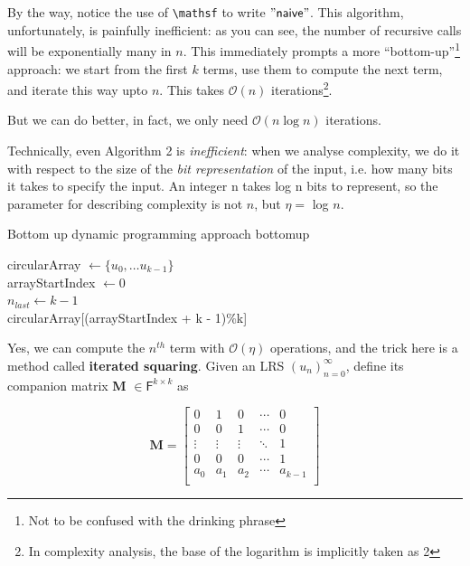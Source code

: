\documentclass{article}
\theoremstyle{definition}
\begin{document}
By the way, notice the use of \verb|\mathsf| to write $\mathsf{"naive"}$. This algorithm,
unfortunately, is painfully inefficient: as you can see, the number of recursive calls will be exponentially many in $n$. This immediately prompts a more
“bottom-up”\footnote{Not to be confused with the drinking phrase} approach: we start from
the first $k$ terms, use them to compute the next term, and iterate this way upto $n$.
This takes $\mathcal{O}(n)$ iterations\footnote{In complexity analysis, the base of the
logarithm is implicitly taken as 2}.

But we can do better, in fact, we only need $\mathcal{O}(n \log {}n)$ iterations.

Technically, even Algorithm 2 is \textit{inefficient}: when we analyse complexity, we do it with respect to the size of the \textit{bit representation} of the input, i.e. how many bits it takes to
specify the input. An integer n takes log n bits to represent, so the parameter for
describing complexity is not $n$, but $\eta = $ log $n$.

\begin{algorithm}[ht]

\caption{Bottom up dynamic programming approach bottomup}

circularArray $\gets \{u_0,\dots u_{k-1}\}$\\
arrayStartIndex $\gets0$\\
$n_{last}\gets k-1$\\
\Return circularArray[(arrayStartIndex + k - 1)\%k]
\end{algorithm}

Yes, we can compute the $n^{th}$ term with $\mathcal{O}(\eta)$ operations, and the trick
here is a method called \textbf{iterated squaring}. Given an LRS $(u_n)_{n=0}^{\infty}$,
define its companion matrix \textbf{M} $\in \mathsf{F}^{k\times k}$ as

\begin{equation}
\label{eq: iterated squaring}
    \textbf{M} = 
    \begin{bmatrix}
        0 & 1 & 0 & \cdots & 0 \\
        0 & 0 & 1 & \cdots & 0 \\
        \vdots & \vdots & \vdots & \ddots & 1 \\
        0 & 0 & 0 & \cdots & 1 \\
        a_{0} & a_{1} & a_{2} & \cdots & a_{k-1} \\
    \end{bmatrix}
\end{equation}
\end{document}

